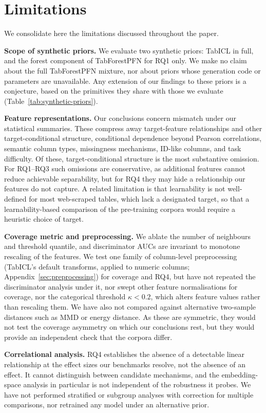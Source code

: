\documentclass{article}
\begin{document}
\section{Limitations}
\label{sec:limitations}

We consolidate here the limitations discussed throughout the paper.

\textbf{Scope of synthetic priors.} We evaluate two synthetic priors: TabICL in full, and the forest component of TabForestPFN for RQ1 only. We make no claim about the full TabForestPFN mixture, nor about priors whose generation code or parameters are unavailable. Any extension of our findings to these priors is a conjecture, based on the primitives they share with those we evaluate (Table~\ref{tab:synthetic-priors}).

\textbf{Feature representations.} Our conclusions concern mismatch under our statistical summaries. These compress away target-feature relationships and other target-conditional structure, conditional dependence beyond Pearson correlations, semantic column types, missingness mechanisms, ID-like columns, and task difficulty. Of these, target-conditional structure is the most substantive omission. For RQ1--RQ3 such omissions are conservative, as additional features cannot reduce achievable separability, but for RQ4 they may hide a relationship our features do not capture. A related limitation is that learnability is not well-defined for most web-scraped tables, which lack a designated target, so that a learnability-based comparison of the pre-training corpora would require a heuristic choice of target.

\textbf{Coverage metric and preprocessing.} We ablate the number of neighbours and threshold quantile, and discriminator AUCs are invariant to monotone rescaling of the features. We test one family of column-level preprocessing (TabICL's default transforms, applied to numeric columns; Appendix~\ref{sec:preprocessing}) for coverage and RQ4, but have not repeated the discriminator analysis under it, nor swept other feature normalisations for coverage, nor the categorical threshold $\kappa < 0.2$, which alters feature values rather than rescaling them. We have also not compared against alternative two-sample distances such as MMD or energy distance. As these are symmetric, they would not test the coverage asymmetry on which our conclusions rest, but they would provide an independent check that the corpora differ.

\textbf{Correlational analysis.} RQ4 establishes the absence of a detectable linear relationship at the effect sizes our benchmarks resolve, not the absence of an effect. It cannot distinguish between candidate mechanisms, and the embedding-space analysis in particular is not independent of the robustness it probes. We have not performed stratified or subgroup analyses with correction for multiple comparisons, nor retrained any model under an alternative prior.
\end{document}
